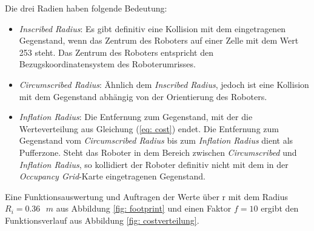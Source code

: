 		  		Die drei Radien haben folgende Bedeutung:\\
		  		
		  		\begin{itemize}
		  			\item \textit{Inscribed Radius}: Es gibt definitiv eine Kollision mit dem eingetragenen Gegenstand, wenn das Zentrum des Roboters auf einer Zelle mit dem Wert 253 steht. Das Zentrum des Roboters entspricht den Bezugskoordinatensystem des Roboterumrisses.\\
		  			
		  			  			
		  			\item \textit{Circumscribed Radius}: Ähnlich dem \textit{Inscribed Radius}, jedoch ist eine Kollision mit dem Gegenstand abhängig von der Orientierung des Roboters. \\
		  			
		  			\item \textit{Inflation Radius}: Die Entfernung zum Gegenstand, mit der die Werteverteilung aus Gleichung (\ref{eq: cost}) endet. Die Entfernung zum Gegenstand vom \textit{Circumscribed Radius} bis zum \textit{Inflation Radius} dient als Pufferzone. Steht das Roboter in dem Bereich zwischen\textit{ Circumscribed} und \textit{Inflation Radius}, so kollidiert der Roboter definitiv nicht mit dem in der \textit{Occupancy Grid}-Karte eingetragenen Gegenstand.\newline
		  		\end{itemize}
		  			    	
		    	
		    	Eine Funktionsauswertung und Auftragen der Werte über r mit dem Radius $R_{i}=0.36\text{ } \si{m}$ aus Abbildung \ref{fig: footprint} und einen Faktor $f=10$ ergibt den Funktionsverlauf aus Abbildung \ref{fig: costverteilung}.
		    	
		   
		   
